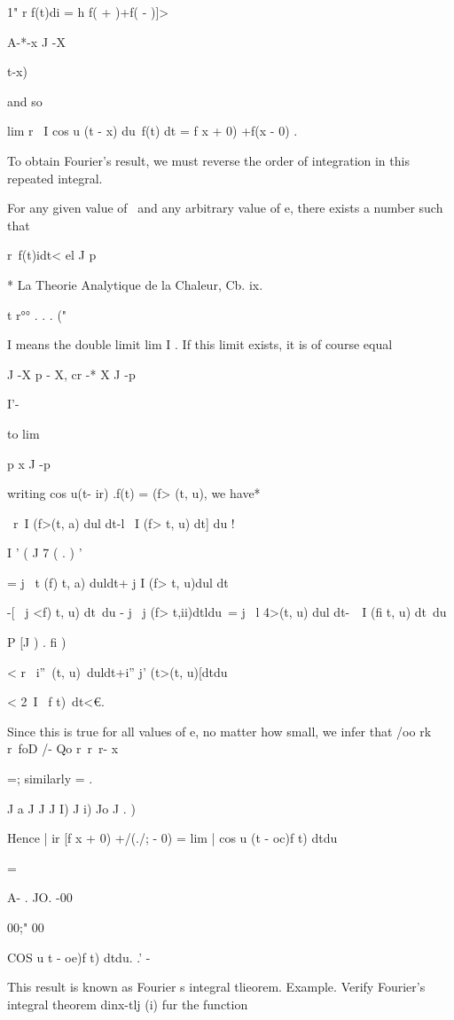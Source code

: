 {1" r f(t)di = h f( + )+f( - )]>

A-*-x J -X

 t-x)

and so

lim r \ I cos u (t - x) du\ f(t) dt = \pi f x + 0) +f(x - 0) .

To obtain Fourier's result, we must reverse the order of integration
in this repeated integral.

For any given value of \ and any arbitrary value of e, there exists a
number such that

r\ f(t)idt< el J p

* La Theorie Analytique de la Chaleur, Cb. ix.

t r°° . . . ("

I means the double limit lim I . If this limit exists, it is of course
equal

J -X p -  X, cr -* X J -p

I'-

to lim

p x J -p

%
%

writing cos u(t- ir) .f(t) = (f> (t, u), we have*

\ r\ I (f>(t, a) dul dt-l \ I (f> t, u) dt] du !

I ' ( J 7 ( . ) '

= j \ t (f) t, a) duldt+ j I (f> t, u)dul dt

-[ \ j <f) t, u) dt\ du - j \ j (f> t,ii)dtldu\ = j \ l 4>(t, u) dul
dt-\ \ I (fi t, u) dt\ du

  P [J ) . fi )

< r \ i''\ < t>(t, u)\ duldt+i'' j' (t>(t, u)[dtdu

< 2\ I \ f t)\ dt<€.

Since this is true for all values of e, no matter how small, we infer
that /oo rk r\ foD /- Qo r\ r\ r- x

=; similarly = .

J a J J J I) J i) Jo J . )

Hence | ir [f x + 0) +/(./; - 0) = lim | cos u (t - oc)f t) dtdu

=

A- . JO. -00

00;" 00

COS u t - oe)f t) dtdu. .' -

This result is known as Fourier s integral tlieorem. Example. Verify
Fourier's integral theorem dinx-tlj (i) fur the function

}
